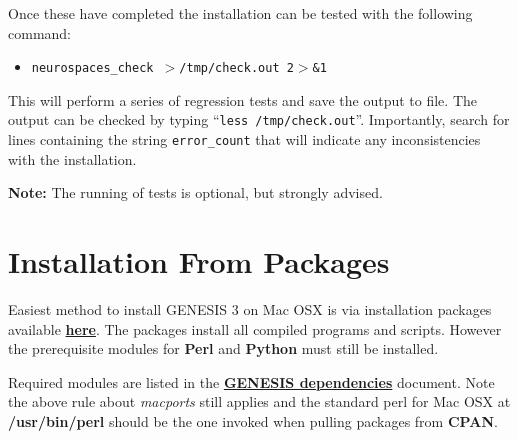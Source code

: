 \documentclass[12pt]{article}
\begin{document}
Once these have completed the installation can be tested with the following command:
\begin{itemize}
   \item[]{\tt neurospaces\_check $>$/tmp/check.out 2$>$\&1}
\end{itemize}
This will perform a series of regression tests and save the output to file. The output can be checked by typing ``{\tt less /tmp/check.out}''. Importantly, search for lines containing the string {\tt error\_count} that will indicate any inconsistencies with the installation.

{\bf Note:} The running of tests is optional, but strongly advised.



\section*{Installation From Packages}

	Easiest method to install GENESIS 3 on Mac OSX is via installation packages available \href{http://repo-genesis3.cbi.utsa.edu/osx/}{\bf here}. The packages install all compiled programs and scripts. However the prerequisite modules for {\bf Perl} and {\bf Python} must still be installed. 
	
	Required modules are listed in the \href{../genesis-dependencies/genesis-dependencies.tex}{\bf GENESIS dependencies} document. Note the above rule about {\it macports} still applies and the standard perl for Mac OSX at {\bf /usr/bin/perl} should be the one invoked when pulling packages from {\bf CPAN}.
\end{document}
